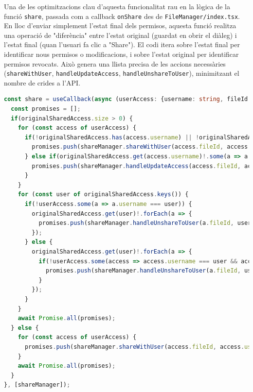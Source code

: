 Una de les optimitzacions clau d'aquesta funcionalitat rau en la lògica de la funció \texttt{share}, passada com a callback \texttt{onShare} des de \texttt{FileManager/index.tsx}. En lloc d'enviar simplement l'estat final dels permisos, aquesta funció realitza una operació de "diferència" entre l'estat original (guardat en obrir el diàleg) i l'estat final (quan l'usuari fa clic a "Share"). El codi itera sobre l'estat final per identificar nous permisos o modificacions, i sobre l'estat original per identificar permisos revocats. Això genera una llista precisa de les accions necessàries (\texttt{shareWithUser}, \texttt{handleUpdateAccess}, \texttt{handleUnshareToUser}), minimitzant el nombre de crides a l'API.

\begin{lstlisting}[language=typescript, caption={Lògica de comparació de permisos a `FileManager/index.tsx`}]
const share = useCallback(async (userAccess: {username: string, fileId: string, accessType: 'READ' | 'WRITE' }[], originalSharedAccess: Map<string, {username: string, fileId: string, accessType: 'READ' | 'WRITE' }[]>) => {
  const promises = [];
  if(originalSharedAccess.size > 0) { 
    for (const access of userAccess) {
      if(!originalSharedAccess.has(access.username) || !originalSharedAccess.get(access.username)!.some(a => a.fileId === access.fileId)) {
        promises.push(shareManager.shareWithUser(access.fileId, access.username, access.accessType));
      } else if(originalSharedAccess.get(access.username)!.some(a => a.fileId === access.fileId && a.accessType !== access.accessType)) {
        promises.push(shareManager.handleUpdateAccess(access.fileId, access.username, access.accessType));
      }
    }
    for (const user of originalSharedAccess.keys()) {
      if(!userAccess.some(a => a.username === user)) {
        originalSharedAccess.get(user)!.forEach(a => {
          promises.push(shareManager.handleUnshareToUser(a.fileId, user));
        });
      } else {
        originalSharedAccess.get(user)!.forEach(a => {
          if(!userAccess.some(access => access.username === user && access.fileId === a.fileId)) {
            promises.push(shareManager.handleUnshareToUser(a.fileId, user));
          }
        });
      }
    }
    await Promise.all(promises);
  } else {
    for (const access of userAccess) {
      promises.push(shareManager.shareWithUser(access.fileId, access.username, access.accessType));
    }
    await Promise.all(promises);
  }
}, [shareManager]);
\end{lstlisting}

